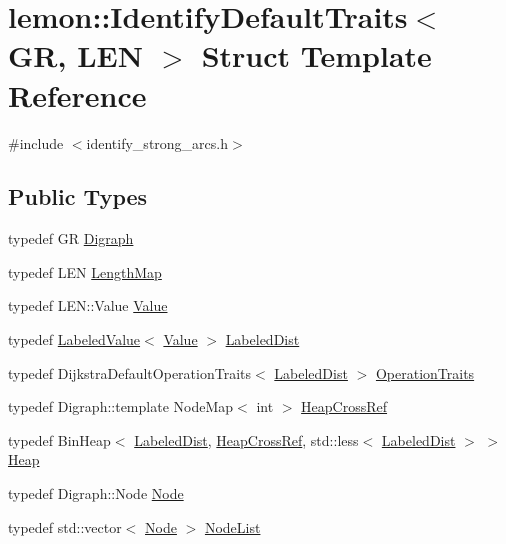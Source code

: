 \hypertarget{structlemon_1_1_identify_default_traits}{}\section{lemon\+:\+:Identify\+Default\+Traits$<$ GR, L\+EN $>$ Struct Template Reference}
\label{structlemon_1_1_identify_default_traits}


{\ttfamily \#include $<$identify\+\_\+strong\+\_\+arcs.\+h$>$}

\subsection*{Public Types}
\begin{DoxyCompactItemize}
\item 
typedef GR \hyperlink{structlemon_1_1_identify_default_traits_a5fddb27be8d17b86b2c4f94e72b8a8da}{Digraph}
\item 
typedef L\+EN \hyperlink{structlemon_1_1_identify_default_traits_a1edc74d982d4d9b918cffcf2ba6b5ec7}{Length\+Map}
\item 
typedef L\+E\+N\+::\+Value \hyperlink{structlemon_1_1_identify_default_traits_ae44641190d3358bbe94ff53a18c36193}{Value}
\item 
typedef \hyperlink{classlemon_1_1_labeled_value}{Labeled\+Value}$<$ \hyperlink{structlemon_1_1_identify_default_traits_ae44641190d3358bbe94ff53a18c36193}{Value} $>$ \hyperlink{structlemon_1_1_identify_default_traits_a6f612abe02956f7a3c607e882d7e8d87}{Labeled\+Dist}
\item 
typedef Dijkstra\+Default\+Operation\+Traits$<$ \hyperlink{structlemon_1_1_identify_default_traits_a6f612abe02956f7a3c607e882d7e8d87}{Labeled\+Dist} $>$ \hyperlink{structlemon_1_1_identify_default_traits_acde989e160acfe85bc44e3e0a1c257fe}{Operation\+Traits}
\item 
typedef Digraph\+::template Node\+Map$<$ int $>$ \hyperlink{structlemon_1_1_identify_default_traits_a05e9c5d0e980eb5f75a09449fc7d597f}{Heap\+Cross\+Ref}
\item 
typedef Bin\+Heap$<$ \hyperlink{structlemon_1_1_identify_default_traits_a6f612abe02956f7a3c607e882d7e8d87}{Labeled\+Dist}, \hyperlink{structlemon_1_1_identify_default_traits_a05e9c5d0e980eb5f75a09449fc7d597f}{Heap\+Cross\+Ref}, std\+::less$<$ \hyperlink{structlemon_1_1_identify_default_traits_a6f612abe02956f7a3c607e882d7e8d87}{Labeled\+Dist} $>$ $>$ \hyperlink{structlemon_1_1_identify_default_traits_abb89b2848e63f4cb0712ca701db72aa4}{Heap}
\item 
typedef Digraph\+::\+Node \hyperlink{structlemon_1_1_identify_default_traits_a8cd1d66e1f5de579d028a3b18561ea5a}{Node}
\item 
typedef std\+::vector$<$ \hyperlink{structlemon_1_1_identify_default_traits_a8cd1d66e1f5de579d028a3b18561ea5a}{Node} $>$ \hyperlink{structlemon_1_1_identify_default_traits_ac7ceaa832e1553cd7fda8d3edc14023e}{Node\+List}
\end{DoxyCompactItemize}
